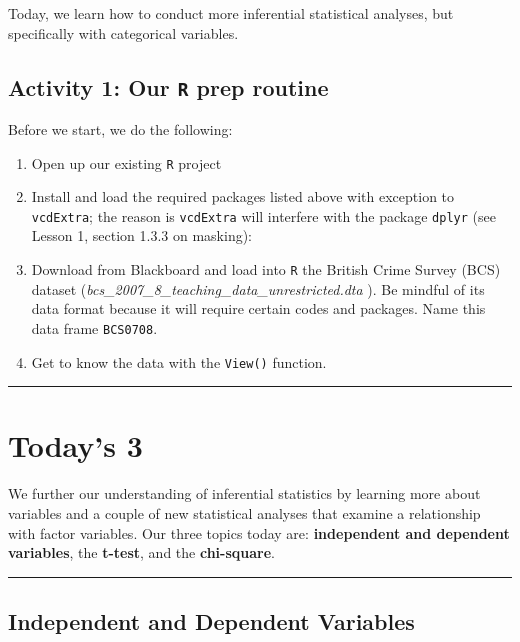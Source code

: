 \documentclass[
]{book}
\begin{document}
Today, we learn how to conduct more inferential statistical analyses, but specifically with categorical variables.

\hypertarget{activity-1-our-r-prep-routine}{%
\subsection{\texorpdfstring{Activity 1: Our \texttt{R} prep routine}{Activity 1: Our R prep routine}}\label{activity-1-our-r-prep-routine}}

Before we start, we do the following:

\begin{enumerate}
\def\labelenumi{\arabic{enumi}.}
\item
  Open up our existing \texttt{R} project
\item
  Install and load the required packages listed above with exception to \texttt{vcdExtra}; the reason is \texttt{vcdExtra} will interfere with the package \texttt{dplyr} (see Lesson 1, section 1.3.3 on masking):
\item
  Download from Blackboard and load into \texttt{R} the British Crime Survey (BCS) dataset (\emph{bcs\_2007\_8\_teaching\_data\_unrestricted.dta} ). Be mindful of its data format because it will require certain codes and packages. Name this data frame \texttt{BCS0708}.
\item
  Get to know the data with the \texttt{View()} function.
\end{enumerate}

\begin{center}\rule{0.5\linewidth}{0.5pt}\end{center}

\hypertarget{todays-3-4}{%
\section{Today's 3}\label{todays-3-4}}

We further our understanding of inferential statistics by learning more about variables and a couple of new statistical analyses that examine a relationship with factor variables. Our three topics today are: \textbf{independent and dependent variables}, the \textbf{t-test}, and the \textbf{chi-square}.

\begin{center}\rule{0.5\linewidth}{0.5pt}\end{center}

\hypertarget{independent-and-dependent-variables}{%
\subsection{Independent and Dependent Variables}\label{independent-and-dependent-variables}}
\end{document}
